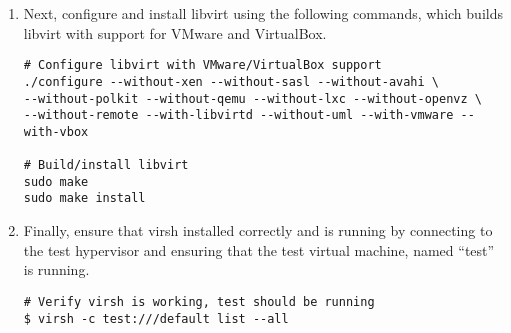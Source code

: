 \begin{enumerate}
\item	Next, configure and install libvirt using the following commands, which builds libvirt with support for VMware and
		VirtualBox.

\lstset{language=bash,caption=Configure and Install libvirt}
\begin{lstlisting}
# Configure libvirt with VMware/VirtualBox support
./configure --without-xen --without-sasl --without-avahi \
--without-polkit --without-qemu --without-lxc --without-openvz \
--without-remote --with-libvirtd --without-uml --with-vmware --with-vbox

# Build/install libvirt
sudo make
sudo make install
\end{lstlisting}	

\item 	Finally, ensure that virsh installed correctly and is running by connecting to the test hypervisor and ensuring 
		that the test virtual machine, named ``test'' is running.

\lstset{language=bash,caption=Verify virsh was Installed Properly}
\begin{lstlisting}
# Verify virsh is working, test should be running
$ virsh -c test:///default list --all
\end{lstlisting}
\end{enumerate}




